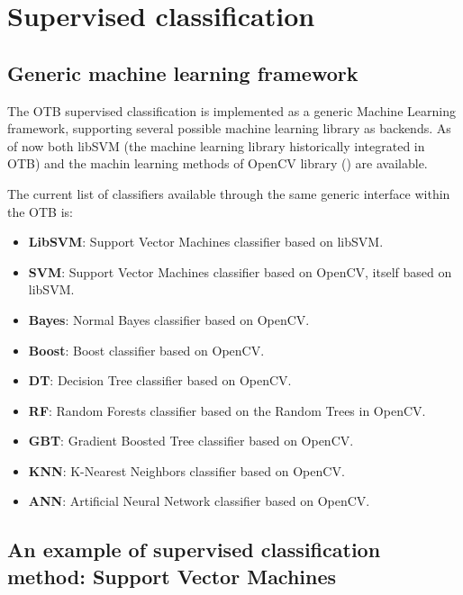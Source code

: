 \ifitkFullVersion

\fi 




\section{Supervised classification}

\subsection{Generic machine learning framework}
\label{sec:MLGenericFramework}

The OTB supervised classification is implemented as a generic Machine Learning 
framework, supporting several possible machine learning library as backends.
As of now both libSVM (the machine learning library historically integrated in OTB)
and the machin learning methods of OpenCV library (\cite{opencv_library}) are available.

The current list of classifiers available through the same generic interface within the OTB is:

\begin{itemize}
  \item \textbf{LibSVM}: Support Vector Machines classifier based on libSVM.
  \item \textbf{SVM}: Support Vector Machines classifier based on OpenCV, itself based on libSVM.
  \item \textbf{Bayes}: Normal Bayes classifier based on OpenCV.
  \item \textbf{Boost}: Boost classifier based on OpenCV.
  \item \textbf{DT}: Decision Tree classifier based on OpenCV.
  \item \textbf{RF}: Random Forests classifier based on the Random Trees in OpenCV.
  \item \textbf{GBT}: Gradient Boosted Tree classifier based on OpenCV.
  \item \textbf{KNN}: K-Nearest Neighbors classifier based on OpenCV.
  \item \textbf{ANN}: Artificial Neural Network classifier based on OpenCV.
\end{itemize}


\subsection{An example of supervised classification method: Support Vector Machines}
\label{sec:SupportVectorMachines}

